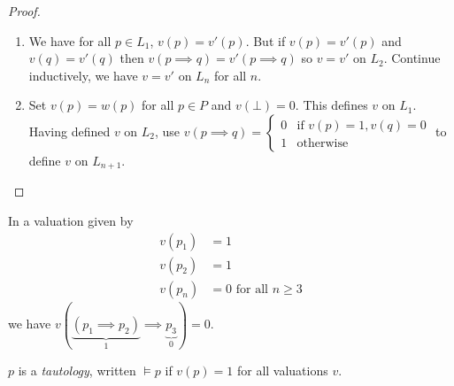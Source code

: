 \documentclass[a4paper]{article}
\begin{document}
\begin{proof}\leavevmode
  \begin{enumerate}
  \item We have for all \(p \in L_1\), \(v(p) = v'(p)\). But if \(v(p) = v'(p)\) and \(v(q) = v'(q)\) then \(v(p \implies q) = v'(p \implies q)\) so \(v = v'\) on \(L_2\). Continue inductively, we have \(v = v'\) on \(L_n\) for all \(n\).
  \item Set \(v(p) = w(p)\) for all \(p \in P\) and \(v(\bot) = 0\). This defines \(v\) on \(L_1\). Having defined \(v\) on \(L_2\), use \(v(p \implies q) = \begin{cases} 0 & \text{if } v(p) = 1, v(q) = 0 \\ 1 & \text{otherwise} \end{cases}\) to define \(v\) on \(L_{n + 1}\).
  \end{enumerate}
\end{proof}

\begin{eg}
  In a valuation given by
  \begin{align*}
    v(p_1) &= 1 \\
    v(p_2) &= 1 \\
    v(p_n) &= 0 \text{ for all } n \geq 3
  \end{align*}
  we have \(v(\underbrace{(p_1 \implies p_2)}_{1} \implies \underbrace{p_3}_{0}) = 0\).
\end{eg}

\begin{definition}[Tautology]
  \(p\) is a \emph{tautology}, written \(\models p\) if \(v(p) = 1\) for all valuations \(v\).
\end{definition}
\end{document}
